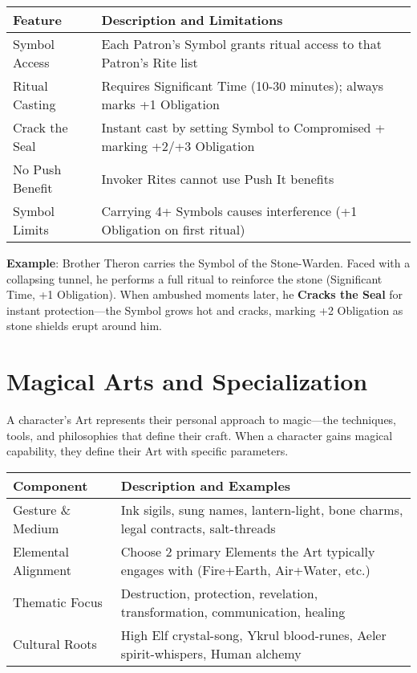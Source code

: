 \begin{fatebox}
\begin{tabularx}{\textwidth}{lX}
\toprule
\textbf{Feature} & \textbf{Description and Limitations} \\
\midrule
Symbol Access & Each Patron's Symbol grants ritual access to that Patron's Rite list \\
Ritual Casting & Requires Significant Time (10-30 minutes); always marks +1 Obligation \\
Crack the Seal & Instant cast by setting Symbol to Compromised + marking +2/+3 Obligation \\
No Push Benefit & Invoker Rites cannot use Push It benefits \\
Symbol Limits & Carrying 4+ Symbols causes interference (+1 Obligation on first ritual) \\
\bottomrule
\end{tabularx}
\end{fatebox}

\textbf{Example}: Brother Theron carries the Symbol of the Stone-Warden. Faced with a collapsing tunnel, he performs a full ritual to reinforce the stone (Significant Time, +1 Obligation). When ambushed moments later, he \textbf{Cracks the Seal} for instant protection—the Symbol grows hot and cracks, marking +2 Obligation as stone shields erupt around him.

\section*{Magical Arts and Specialization}

A character's Art represents their personal approach to magic—the techniques, tools, and philosophies that define their craft. When a character gains magical capability, they define their Art with specific parameters.

\begin{fatebox}
\begin{tabularx}{\textwidth}{lX}
\toprule
\textbf{Component} & \textbf{Description and Examples} \\
\midrule
Gesture \& Medium & Ink sigils, sung names, lantern-light, bone charms, legal contracts, salt-threads \\
Elemental Alignment & Choose 2 primary Elements the Art typically engages with (Fire+Earth, Air+Water, etc.) \\
Thematic Focus & Destruction, protection, revelation, transformation, communication, healing \\
Cultural Roots & High Elf crystal-song, Ykrul blood-runes, Aeler spirit-whispers, Human alchemy \\
\bottomrule
\end{tabularx}
\end{fatebox}

